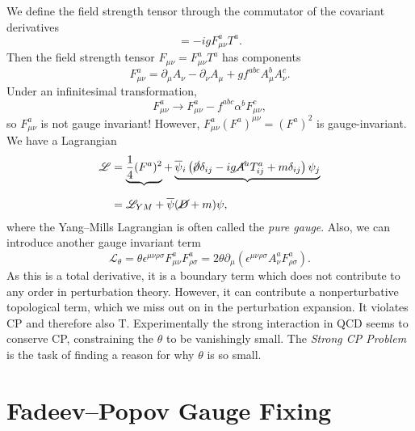 We define the field strength tensor through the commutator of the covariant derivatives
\begin{equation}
  [D_{\mu}, D_{\nu}] = -i g F_{\mu\nu}^{a} T^{a}.
\end{equation}
Then the field strength tensor $F_{\mu\nu}= F_{\mu\nu}^{a} T^{a}$ has components
\begin{equation}
  F_{\mu\nu}^{a} = \partial_{\mu} A_{\nu} - \partial_{\nu} A_{\mu} + g f^{abc} A^{b}_{\mu} A_{\nu}^{c}.
\end{equation}
Under an infinitesimal transformation,
\begin{equation}
  F_{\mu\nu}^{a} \to F_{\mu\nu}^{a} - f^{abc} \alpha^{b} F^{c}_{\mu\nu},
\end{equation}
so $F_{\mu\nu}^{a}$ is not gauge invariant! However, $F_{\mu\nu}^{a} (F^{a})^{\mu\nu} = (F^{a})^2$ is gauge-invariant.
We have a Lagrangian
\begin{align}
  \mathscr{L} &= \underbrace{\frac{1}{4} (F^{a})^2}_{\mathclap{}} + \underbrace{\overline{\psi}{}_{i} \left( \cancel{\partial} \delta_{ij} - i g \cancel{A}^a T^{a}_{ij} + m \delta_{ij} \right) \psi_{j}}_{\mathclap{}} \\
	      &= \mathscr{L}_{YM} + \overline{\psi}{} (\cancel{D} + m) \psi,
\end{align}
where the Yang--Mills Lagrangian is often called the \emph{pure gauge}.
Also, we can introduce another gauge invariant term
\begin{equation}
  \mathscr{L}_{\theta} = \theta \epsilon^{\mu\nu\rho\sigma} F^{a}_{\mu\nu} F^{a}_{\rho\sigma} = 2 \theta \partial_{\mu} (\epsilon^{\mu\nu\rho\sigma} A^{a}_{\nu} F_{\rho\sigma}^{a}).
\end{equation}
As this is a total derivative, it is a boundary term which does not contribute to any order in perturbation theory. However, it can contribute a nonperturbative topological term, which we miss out on in the perturbation expansion. It violates CP and therefore also T. Experimentally the strong interaction in QCD seems to conserve CP, constraining the $\theta$ to be vanishingly small. The \emph{Strong CP Problem} is the task of finding a reason for why $\theta$ is so small.

\section{Fadeev--Popov Gauge Fixing}%
\label{sec:fadeev_popov_gauge_fixing}

